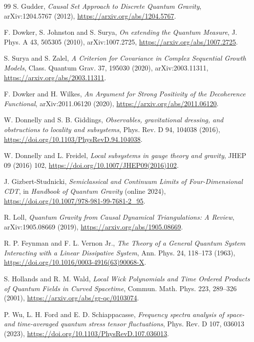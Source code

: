 \documentclass[11pt,a4paper]{article}
\begin{document}
\begin{thebibliography}{99}
S. Gudder, \textit{Causal Set Approach to Discrete Quantum Gravity}, arXiv:1204.5767 (2012),
\url{https://arxiv.org/abs/1204.5767}.

F. Dowker, S. Johnston and S. Surya,
\textit{On extending the Quantum Measure}, J. Phys. A 43, 505305 (2010),
arXiv:1007.2725, \url{https://arxiv.org/abs/1007.2725}.

S. Surya and S. Zalel, \textit{A Criterion for Covariance in Complex Sequential Growth Models},
Class. Quantum Grav. 37, 195030 (2020), arXiv:2003.11311,
\url{https://arxiv.org/abs/2003.11311}.


F. Dowker and H. Wilkes,
\textit{An Argument for Strong Positivity of the Decoherence Functional},
arXiv:2011.06120 (2020),
\url{https://arxiv.org/abs/2011.06120}.

W. Donnelly and S. B. Giddings,
\textit{Observables, gravitational dressing, and obstructions to locality and subsystems},
Phys. Rev. D 94, 104038 (2016),
\url{https://doi.org/10.1103/PhysRevD.94.104038}.

W. Donnelly and L. Freidel,
\textit{Local subsystems in gauge theory and gravity},
JHEP 09 (2016) 102,
\url{https://doi.org/10.1007/JHEP09(2016)102}.


J. Gizbert-Studnicki, \textit{Semiclassical and Continuum Limits of Four-Dimensional CDT},
in \emph{Handbook of Quantum Gravity} (online 2024),
\url{https://doi.org/10.1007/978-981-99-7681-2_95}.

R. Loll, \textit{Quantum Gravity from Causal Dynamical Triangulations: A Review},
arXiv:1905.08669 (2019), \url{https://arxiv.org/abs/1905.08669}.

R. P. Feynman and F. L. Vernon Jr.,
\textit{The Theory of a General Quantum System Interacting with a Linear Dissipative System},
Ann. Phys. 24, 118--173 (1963),
\url{https://doi.org/10.1016/0003-4916(63)90068-X}.


S. Hollands and R. M. Wald,
\textit{Local Wick Polynomials and Time Ordered Products of Quantum Fields in Curved Spacetime},
Commun. Math. Phys. 223, 289--326 (2001),
\url{https://arxiv.org/abs/gr-qc/0103074}.

P. Wu, L. H. Ford and E. D. Schiappacasse,
\textit{Frequency spectra analysis of space- and time-averaged quantum stress tensor fluctuations},
Phys. Rev. D 107, 036013 (2023),
\url{https://doi.org/10.1103/PhysRevD.107.036013}.



\end{thebibliography}
\end{document}

